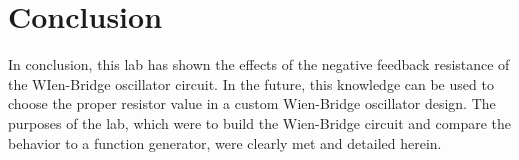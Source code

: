 \documentclass[12pt,letterpaper]{report}
\begin{document}
\section*{Conclusion}

In conclusion, this lab has shown the effects of the negative feedback resistance of the WIen-Bridge oscillator circuit. In the future, this knowledge can be used to choose the proper resistor value in a custom Wien-Bridge oscillator design. The purposes of the lab, which were to build the Wien-Bridge circuit and compare the behavior to a function generator, were clearly met and detailed herein.
\end{document}

